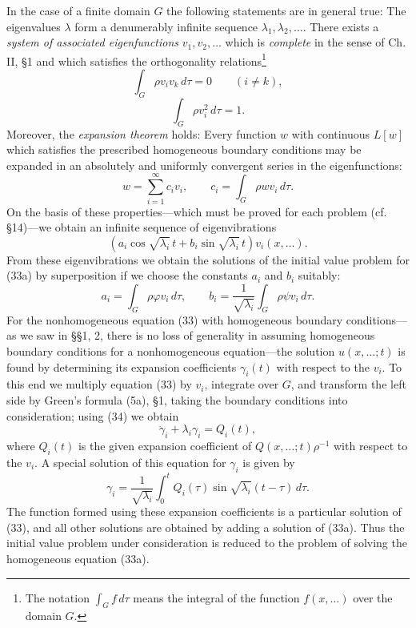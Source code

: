 In the case of a finite domain $G$ the following statements are in general true: The eigenvalues $\lambda$ form a denumerably infinite sequence $\lambda_1,\lambda_2,\ldots$. There exists a \emph{system of associated eigenfunctions} $v_1,v_2,\ldots$ which is \emph{complete} in the sense of Ch. II, \S1 and which satisfies the orthogonality relations\footnote{The notation $\int_G f\,d\tau$ means the integral of the function $f(x,\ldots)$ over the domain $G$.}
\[
\int_G\rho v_iv_k\,d\tau=0\qquad(i\ne k),
\]
\[
\int_G\rho v_i^2\,d\tau=1.
\]
Moreover, the \emph{expansion theorem} holds: Every function $w$ with continuous $L[w]$ which satisfies the prescribed homogeneous boundary conditions may be expanded in an absolutely and uniformly convergent series in the eigenfunctions:
\[
w=\sum_{i=1}^{\infty}c_iv_i,
\qquad
c_i=\int_G\rho wv_i\,d\tau.
\]
On the basis of these properties---which must be proved for each problem (cf. \S14)---we obtain an infinite sequence of eigenvibrations
\[
(a_i\cos\sqrt{\lambda_i}\,t+b_i\sin\sqrt{\lambda_i}\,t)v_i(x,\ldots).
\]
From these eigenvibrations we obtain the solutions of the initial value problem for (33a) by superposition if we choose the constants $a_i$ and $b_i$ suitably:
\[
a_i=\int_G\rho\varphi v_i\,d\tau,
\qquad
b_i=\frac1{\sqrt{\lambda_i}}\int_G\rho\psi v_i\,d\tau.
\]
For the nonhomogeneous equation (33) with homogeneous boundary conditions---as we saw in \S\S1, 2, there is no loss of generality in assuming homogeneous boundary conditions for a nonhomogeneous equation---the solution $u(x,\ldots;t)$ is found by determining its expansion coefficients $\gamma_i(t)$ with respect to the $v_i$. To this end we multiply equation (33) by $v_i$, integrate over $G$, and transform the left side by Green's formula (5a), \S1, taking the boundary conditions into consideration; using (34) we obtain
\[
\ddot\gamma_i+\lambda_i\gamma_i=Q_i(t),
\]
where $Q_i(t)$ is the given expansion coefficient of $Q(x,\ldots;t)\rho^{-1}$ with respect to the $v_i$. A special solution of this equation for $\gamma_i$ is given by
\[
\gamma_i=\frac1{\sqrt{\lambda_i}}\int_0^tQ_i(\tau)\sin\sqrt{\lambda_i}(t-\tau)\,d\tau.
\]
The function formed using these expansion coefficients is a particular solution of (33), and all other solutions are obtained by adding a solution of (33a). Thus the initial value problem under consideration is reduced to the problem of solving the homogeneous equation (33a).

